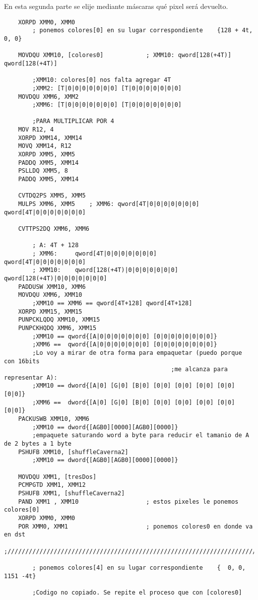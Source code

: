 En esta segunda parte se elije mediante m\'ascaras qu\'e pixel ser\'a devuelto. 
\begin{codesnippet}
\begin{verbatim}
    XORPD XMM0, XMM0
        ; ponemos colores[0] en su lugar correspondiente	{128 + 4t, 0, 0}
    
    MOVDQU XMM10, [colores0] 			; XMM10: qword[128(+4T)] qword[128(+4T)] 
    
        ;XMM10: colores[0] nos falta agregar 4T
        ;XMM2: [T|0|0|0|0|0|0|0] [T|0|0|0|0|0|0|0]
    MOVDQU XMM6, XMM2
        ;XMM6: [T|0|0|0|0|0|0|0] [T|0|0|0|0|0|0|0]
    
        ;PARA MULTIPLICAR POR 4
    MOV R12, 4
    XORPD XMM14, XMM14
    MOVQ XMM14, R12
    XORPD XMM5, XMM5
    PADDQ XMM5, XMM14
    PSLLDQ XMM5, 8
    PADDQ XMM5, XMM14
    
    CVTDQ2PS XMM5, XMM5
    MULPS XMM6, XMM5	; XMM6: qword[4T|0|0|0|0|0|0|0] qword[4T|0|0|0|0|0|0|0]
    
    CVTTPS2DQ XMM6, XMM6
    
        ; A: 4T + 128
        ; XMM6: 	qword[4T|0|0|0|0|0|0|0] 		qword[4T|0|0|0|0|0|0|0]
        ; XMM10: 	qword[128(+4T)|0|0|0|0|0|0|0] 	qword[128(+4T)|0|0|0|0|0|0|0]
    PADDUSW XMM10, XMM6
    MOVDQU XMM6, XMM10
        ;XMM10 == XMM6 == qword[4T+128] qword[4T+128]
    XORPD XMM15, XMM15
    PUNPCKLQDQ XMM10, XMM15
    PUNPCKHQDQ XMM6, XMM15
        ;XMM10 == qword{[A|0|0|0|0|0|0|0] [0|0|0|0|0|0|0|0]}
        ;XMM6 ==  qword{[A|0|0|0|0|0|0|0] [0|0|0|0|0|0|0|0]}
        ;Lo voy a mirar de otra forma para empaquetar (puedo porque con 16bits 
		                                       ;me alcanza para representar A):
        ;XMM10 == dword{[A|0] [G|0] [B|0] [0|0] [0|0] [0|0] [0|0] [0|0]}
        ;XMM6 ==  dword{[A|0] [G|0] [B|0] [0|0] [0|0] [0|0] [0|0] [0|0]}
    PACKUSWB XMM10, XMM6
        ;XMM10 == dword{[AGB0][0000][AGB0][0000]}
        ;empaquete saturando word a byte para reducir el tamanio de A de 2 bytes a 1 byte
    PSHUFB XMM10, [shuffleCaverna2]
        ;XMM10 == dword{[AGB0][AGB0][0000][0000]}
    
    MOVDQU XMM1, [tresDos] 
    PCMPGTD XMM1, XMM12	
    PSHUFB XMM1, [shuffleCaverna2]
    PAND XMM1 , XMM10 					; estos pixeles le ponemos colores[0]
    XORPD XMM0, XMM0
    POR XMM0, XMM1						; ponemos colores0 en donde va en dst
	;///////////////////////////////////////////////////////////////////////////////

        ; ponemos colores[4] en su lugar correspondiente	{  0, 0, 1151 -4t}

        ;Codigo no copiado. Se repite el proceso que con [colores0]

\end{verbatim}
\end{codesnippet}

